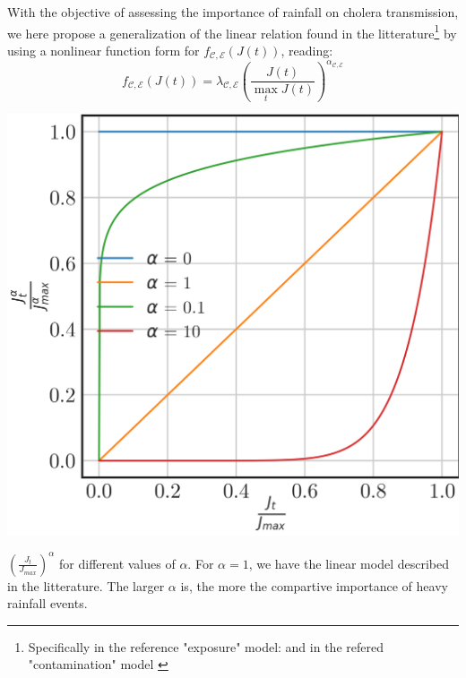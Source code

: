 With the objective of assessing the importance of rainfall on cholera transmission, we here propose a generalization of the linear relation found in the litterature\footnote{Specifically in the reference "exposure" model: \parencite{Eisenberg:ExaminingRainfallCholera:2013} and in the refered "contamination" model \parencite{Rinaldo:Reassessment20102011:2012}} by using a nonlinear function form for  $f_{\mathcal{C,E}}\left(J(t)\right)$, reading:
\begin{equation}
    f_{\mathcal{C,E}}\left(J(t)\right)=\lambda_{\mathcal{C,E}} \left(\frac{J(t)}{\max_t J(t)}\right)^{\alpha_{\mathcal{C,E}}}
    \label{eq:nonlinear_rain}
\end{equation}
\begin{marginfigure}
	\centering
	\includegraphics[width=\textwidth]{fig_cholera-rainfall/alpha.png}
	\caption{$\left(\frac{J_t}{J_{max}}\right)^\alpha$ for different values of $\alpha$. For $\alpha = 1$, we have the linear model described in the litterature. The larger $\alpha$ is, the more the compartive importance of heavy rainfall events.}
	\label{fig:alpha}
\end{marginfigure}
